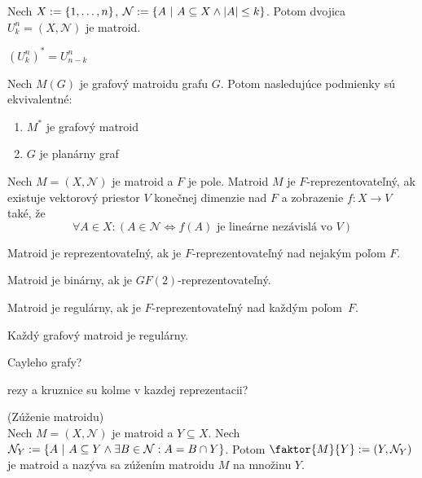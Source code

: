 \begin{definition}
Nech $X:=\left\{1, \ldots, n\right\}$, $\mathcal{N}:=\left\{A ~|~ A \subseteq X \wedge \left|A\right| \leq k\right\}$. Potom 
dvojica $U_k^n = (X, \mathcal{N})$ je matroid.
\end{definition}

\begin{theorem}
$(U_k^n)^* = U_{n-k}^n$
\end{theorem}

\begin{theorem}
Nech $M(G)$ je grafový matroidu grafu $G$. Potom nasledujúce podmienky sú ekvivalentné:
\begin{enumerate}
    \item $M^*$ je grafový matroid
    \item $G$ je planárny graf
\end{enumerate}
\end{theorem}

\begin{definition}
Nech $M=(X, \mathcal{N})$ je matroid a $F$ je pole. Matroid $M$ je $F$-reprezentovateľný, ak
existuje vektorový priestor $V$ konečnej dimenzie nad $F$ a zobrazenie $f:X \to V$ také, že
$$\forall A \in X: \left(A \in \mathcal{N} \Longleftrightarrow f(A) \text{ je lineárne nezávislá vo } V \right)$$ 
\end{definition}

\begin{definition}
Matroid je reprezentovateľný, ak je $F$-reprezentovateľný nad nejakým poľom $F$.
\end{definition}

\begin{definition}
Matroid je binárny, ak je $GF(2)$-reprezentovateľný.
\end{definition}

\begin{definition}
Matroid je regulárny, ak je $F$-reprezentovateľný nad každým poľom~$F$.
\end{definition}

\begin{theorem_hard}
Každý grafový matroid je regulárny.
\end{theorem_hard}

\TODO Cayleho grafy?

\TODO rezy a kruznice su kolme v kazdej reprezentacii?

\begin{definition}{(Zúženie matroidu)}\\
Nech $M = (X, \mathcal{N})$ je matroid a $Y \subseteq X$. 
Nech $\mathcal{N}_Y := \left\{A ~|~ A \subseteq Y \wedge \exists B \in \mathcal{N}: A = B \cap Y\right\}$.
Potom $\faktor{M}{Y} := (Y, \mathcal{N}_Y)$ je matroid a nazýva sa zúžením matroidu $M$ na množinu $Y$.
\end{definition}

